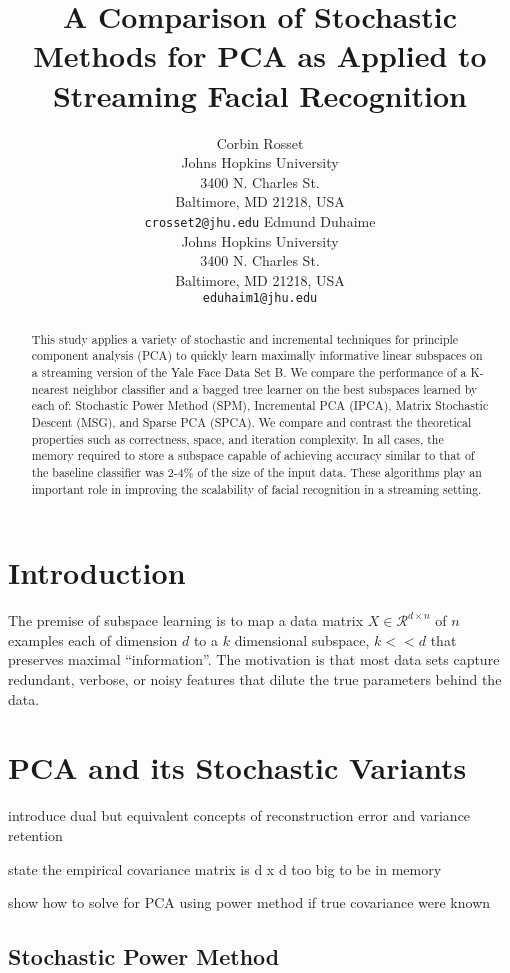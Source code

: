 \documentclass[11pt,letterpaper]{article}
\title{A Comparison of Stochastic Methods for PCA as Applied to Streaming Facial Recognition\Thanks{We would like to thank Dr. Raman Arora for his work on stochastic algorithms for manifold learning.}}
\author{Corbin Rosset\\
  Johns Hopkins University\\
  3400 N. Charles St.\\
  Baltimore, MD 21218, USA\\
  {\tt crosset2@jhu.edu}
  \And
  Edmund Duhaime \\
  Johns Hopkins University\\
  3400 N. Charles St.\\
  Baltimore, MD 21218, USA\\
  {\tt eduhaim1@jhu.edu}}
\date{}
\begin{document}
\maketitle
\begin{abstract}
  This study applies a variety of stochastic and incremental techniques for principle component analysis (PCA) to quickly learn maximally informative linear subspaces on a streaming version of the Yale Face Data Set B. We compare the performance of a K-nearest neighbor classifier and a bagged tree learner on the best subspaces learned by each of: Stochastic Power Method (SPM), Incremental PCA (IPCA), Matrix Stochastic Descent (MSG), and Sparse PCA (SPCA). We compare and contrast the theoretical properties such as correctness, space, and iteration complexity. In all cases, the memory required to store a subspace capable of achieving accuracy similar to that of the baseline classifier was  2-4$\%$ of the size of the input data. These algorithms play an important role in improving the scalability of facial recognition in a streaming setting. 
\end{abstract}

\section{Introduction}

The premise of subspace learning is to map a data matrix $X \in \mathcal{R}^{d \times n}$ of $n$ examples each of dimension $d$ to a $k$ dimensional subspace, $k << d$ that preserves maximal ``information''. The motivation is that most data sets capture redundant, verbose, or noisy features that dilute the true parameters behind the data.  



\section{PCA and its Stochastic Variants}

introduce dual but equivalent concepts of reconstruction error and variance retention

state the empirical covariance matrix is d x d too big to be in memory

show how to solve for PCA using power method if true covariance were known



\subsection{Stochastic Power Method}
\end{document}
